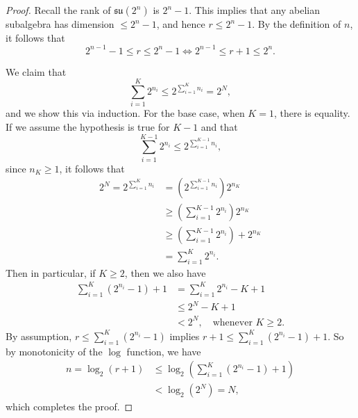 \documentclass{article}
\begin{document}
    \begin{proof}
        Recall the rank of $\mathfrak{su}(2^n)$ is $2^n-1$. This implies that any abelian subalgebra has dimension $\leq 2^n-1$, and hence $r\leq 2^n-1$. By the definition of $n$, it follows that 
        \begin{equation}
            2^{n-1}-1\leq r\leq 2^n-1 \iff 2^{n-1}\leq r+1\leq 2^n. 
        \end{equation}
        
        We claim that 
        \begin{equation}
            \sum\limits_{i=1}^K2^{n_i}\leq 2^{\sum\limits_{i=1}^Kn_i}=2^N,
        \end{equation}
        and we show this via induction. For the base case, when $K=1$, there is equality. If we assume the hypothesis is true for $K-1$ and that 
        \begin{equation*}
            \sum\limits_{i=1}^{K-1}2^{n_i}\leq 2^{\sum\limits_{i=1}^{K-1}n_i},
        \end{equation*}
        since $n_K\geq 1$, it follows that 
        \begin{align}
            2^N =  2^{\sum\limits_{i=1}^Kn_i} 
            & = \left(2^{\sum\limits_{i=1}^{K-1}n_i}\right)2^{n_K} \\
            & \geq  \left(\sum\limits_{i=1}^{K-1}2^{n_i}\right)2^{n_K} \\
            & \geq \left(\sum\limits_{i=1}^{K-1}2^{n_i}\right) + 2^{n_K} \\
            & = \sum\limits_{i=1}^{K}2^{n_i}.
        \end{align}
        Then in particular, if $K\geq 2$, then we also have 
        \begin{align}
            \sum\limits_{i=1}^K\left(2^{n_i}-1\right) +1 
            & = \sum\limits_{i=1}^K 2^{n_i} - K+1 \\ 
            & \leq 2^N - K+1 \\
            & < 2^N, \quad\text{whenever } K\geq 2.
        \end{align}
        By assumption, $r\leq \sum\limits_{i=1}^K(2^{n_i}-1)$ implies $r+1\leq \sum\limits_{i=1}^K(2^{n_i}-1) +1$. So by monotonicity of the $\log$ function, we have 
        \begin{align}
            n = \log_2(r+1) 
            & \leq \log_2\left(\sum\limits_{i=1}^K\left(2^{n_i}-1\right) +1 \right) \\
            & < \log_2(2^N) = N,
        \end{align}
        which completes the proof. 
    \end{proof}
\end{document}
